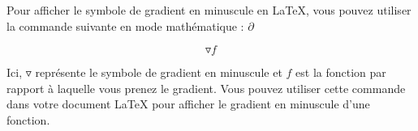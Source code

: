 \documentclass{book}
\begin{document}
Pour afficher le symbole de gradient en minuscule en LaTeX, vous pouvez utiliser la commande suivante en mode mathématique :
$\partial$

\[
\triangledown f
\]

Ici, \( \triangledown \) représente le symbole de gradient en minuscule et \( f \) est la fonction par rapport à laquelle vous prenez le gradient. Vous pouvez utiliser cette commande dans votre document LaTeX pour afficher le gradient en minuscule d'une fonction.
\end{document}
